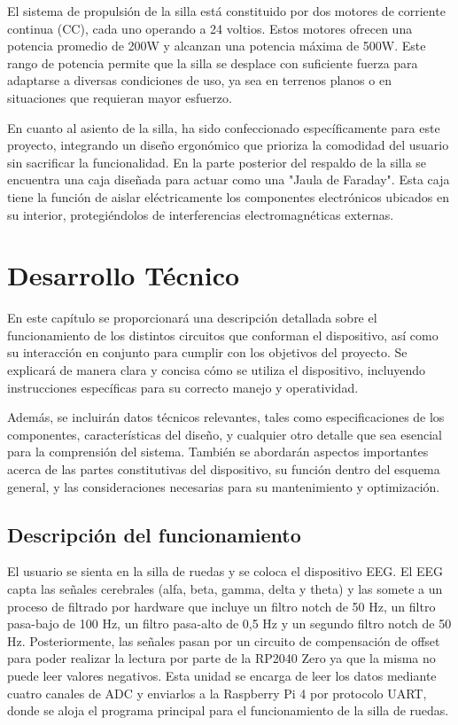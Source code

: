 \documentclass{article}
\begin{document}
El sistema de propulsión de la silla está constituido por dos motores de corriente continua (CC), cada uno operando a 24 voltios. Estos motores ofrecen una potencia promedio de 200W y alcanzan una potencia máxima de 500W. Este rango de potencia permite que la silla se desplace con suficiente fuerza para adaptarse a diversas condiciones de uso, ya sea en terrenos planos o en situaciones que requieran mayor esfuerzo.

En cuanto al asiento de la silla, ha sido confeccionado específicamente para este proyecto, integrando un diseño ergonómico que prioriza la comodidad del usuario sin sacrificar la funcionalidad. En la parte posterior del respaldo de la silla se encuentra una caja diseñada para actuar como una "Jaula de Faraday". Esta caja tiene la función de aislar eléctricamente los componentes electrónicos ubicados en su interior, protegiéndolos de interferencias electromagnéticas externas. 

\section{Desarrollo Técnico}
En este capítulo se proporcionará una descripción detallada sobre el funcionamiento de los distintos circuitos que conforman el dispositivo, así como su interacción en conjunto para cumplir con los objetivos del proyecto. Se explicará de manera clara y concisa cómo se utiliza el dispositivo, incluyendo instrucciones específicas para su correcto manejo y operatividad.

Además, se incluirán datos técnicos relevantes, tales como especificaciones de los componentes, características del diseño, y cualquier otro detalle que sea esencial para la comprensión del sistema. También se abordarán aspectos importantes acerca de las partes constitutivas del dispositivo, su función dentro del esquema general, y las consideraciones necesarias para su mantenimiento y optimización.

\subsection{Descripción del funcionamiento}
El usuario se sienta en la silla de ruedas y se coloca el dispositivo EEG. El EEG capta las señales cerebrales (alfa, beta, gamma, delta y theta) y las somete a un proceso de filtrado por hardware que incluye un filtro notch de 50 Hz, un filtro pasa-bajo de 100 Hz, un filtro pasa-alto de 0,5 Hz y un segundo filtro notch de 50 Hz. Posteriormente, las señales pasan por un circuito de compensación de offset para poder realizar la lectura por parte de la RP2040 Zero ya que la misma no puede leer valores negativos. Esta unidad se encarga de leer los datos mediante cuatro canales de ADC y enviarlos a la Raspberry Pi 4 por protocolo UART, donde se aloja el programa principal para el funcionamiento de la silla de ruedas.
\end{document}
